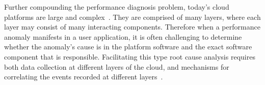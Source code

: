 %

Further compounding the performance
diagnosis problem, today's cloud platforms are 
large and complex~\cite{DaCunhaRodrigues:2016:MCC:2851613.2851619,Ibidunmoye:2015:PAD:2808687.2791120}. 
They are
comprised of many layers, where each layer may consist of many interacting components.
Therefore when a performance anomaly manifests in a user application, it is
often challenging
to determine whether the anomaly's cause is in the platform software
and the exact software component that is responsible. 
Facilitating this type root cause analysis requires
both data collection at different layers of the cloud, and mechanisms for correlating 
the events recorded at different layers~\cite{7420511}. 
%
%


